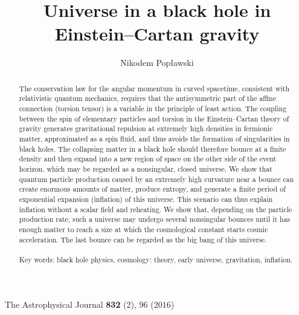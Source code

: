 \documentclass[prd,onecolumn,nofootinbib]{revtex4}
\begin{document}
\noindent
The Astrophysical Journal {\bf 832} (2), 96 (2016)\\

\title{Universe in a black hole in Einstein--Cartan gravity}
\author{Nikodem Pop{\l}awski}


\begin{abstract}
The conservation law for the angular momentum in curved spacetime, consistent with relativistic quantum mechanics, requires that the antisymmetric part of the affine connection (torsion tensor) is a variable in the principle of least action.
The coupling between the spin of elementary particles and torsion in the Einstein--Cartan theory of gravity generates gravitational repulsion at extremely high densities in fermionic matter, approximated as a spin fluid, and thus avoids the formation of singularities in black holes.
The collapsing matter in a black hole should therefore bounce at a finite density and then expand into a new region of space on the other side of the event horizon, which may be regarded as a nonsingular, closed universe.
We show that quantum particle production caused by an extremely high curvature near a bounce can create enormous amounts of matter, produce entropy, and generate a finite period of exponential expansion (inflation) of this universe.
This scenario can thus explain inflation without a scalar field and reheating.
We show that, depending on the particle production rate, such a universe may undergo several nonsingular bounces until it has enough matter to reach a size at which the cosmological constant starts cosmic acceleration.
The last bounce can be regarded as the big bang of this universe.\\ \\
Key words: black hole physics, cosmology: theory, early universe, gravitation, inflation.
\end{abstract}
\maketitle
\end{document}
